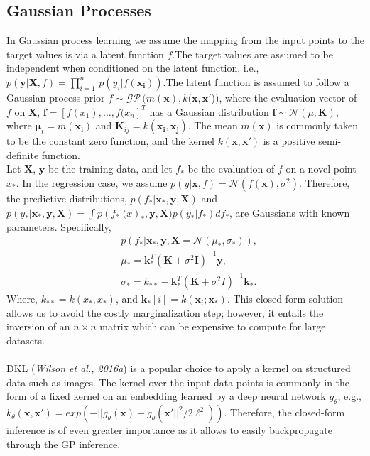 \documentclass[preprint,11pt]{elsarticle}
\begin{document}
    \subsection{Gaussian Processes}
    \label{sec:2.2}
        In Gaussian process learning we assume the mapping from
        the input points to the target values is via a latent function
        $f$.The target values are assumed to be independent
        when conditioned on the latent function, i.e., $p(\boldsymbol{y}|\bm{X},f)=\prod_{i=1}^{n}\, p(y_i|f(\boldsymbol{x_i}))$.The latent function is assumed to follow
        a Gaussian process prior $f\sim\mathcal{GP}\,(m(\boldsymbol{x}),k(\boldsymbol{x},\boldsymbol{x'}$)), where
        the evaluation vector of $f$ on $\bm{X}$, $\boldsymbol{f} = [f(x_1),\ldots,f(x_n]^T$ has a Gaussian distribution $\bm{f} \sim \mathcal{N}(\mu,\boldsymbol{K})$, where $\bm{\mu}_i = m(\bm{x_i})$ and $\bm{K}_{ij} = k(\bm{x_i},\bm{x_j}).$ The mean $m(\bm{x})$ is commonly taken to be the constant zero function, and the kernel
        $k(\bm{x},\bm{x'})$ is a positive semi-definite function.
        \\
        Let $\bm{X}$, $\bm{y}$ be the training data, and let $f_*$ be the evaluation
        of $f$ on a novel point $x_*$. In the regression case, we
        assume $p(y|\bm{x}, f) = \mathcal{N}(f(\bm{x}), \sigma^2)$. Therefore, the predictive distributions, $p(f_*|\bm{x}_*, \bm{y},\bm{X})$ and $p(y_*|\bm{x}_*, \bm{y},\bm{X}) = \int p(f_*|\bm(x)_*,\bm{y},\bm{X})p(y_*|f_*)df_* $, are Gaussians with known parameters. Specifically,
        \begin{align}
            &p( f_*|\bm{x}_*,\bm{y},\bm{X} = \mathcal{N}( \mu_*,\sigma_* ) ), \nonumber \\
            &\mu_*  = \bm{k}_*^T( \bm{K}+\sigma^2\bm{I} )^{-1}\bm{y}, \\
            &\sigma_* = k_{**} - \bm{k}_*^T( \bm{K} + \sigma^2I )^{-1}\bm{k}_*.\nonumber
        \end{align}
        Where, $k_{**} = k(x_*, x_*)$, and $\bm{k}_*[i] = k(\bm{x}_i; \bm{x}_*)$. This
        closed-form solution allows us to avoid the costly marginalization
        step; however, it entails the inversion of an $n \times n$
        matrix which can be expensive to compute for large datasets.\\
        \\
        DKL (\textit{Wilson et al., 2016a}\cite{wilson2016deep}) is a popular choice to apply a
        kernel on structured data such as images. The kernel over the
        input data points is commonly in the form of a fixed kernel
        on an embedding learned by a deep neural network $g_\theta$, e.g.,
        $k_\theta(\bm{x}, \bm{x'}) = exp( -||g_\theta( \bm{x} ) - g_\theta(\bm{x'}||^2/2\ell^2)  )$. Therefore,
        the closed-form inference is of even greater importance as
        it allows to easily backpropagate through the GP inference.
        
\end{document}
